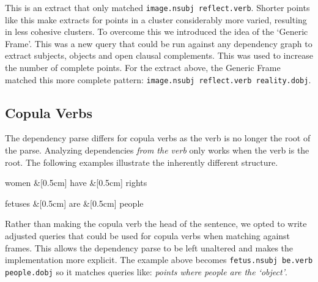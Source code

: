       This is an extract that only matched \texttt{image.nsubj reflect.verb}. Shorter points like this make extracts for points in a cluster considerably more varied, resulting in less cohesive clusters. To overcome this we introduced the idea of the `Generic Frame'. This was a new query that could be run against any dependency graph to extract subjects, objects and open clausal complements. This was used to increase the number of complete points. For the extract above, the Generic Frame matched this more complete pattern: \texttt{image.nsubj reflect.verb reality.dobj}.

    \tocless\subsection{Copula Verbs}
      The dependency parse differs for copula verbs as the verb is no longer the root of the parse. Analyzing dependencies \textit{from the verb} only works when the verb is the root. The following examples illustrate the inherently different structure.
      \begin{multicols}{2}
        \raggedcolumns
        \begin{center}
          \begin{dependency}[edge horizontal padding=0]
            \begin{deptext}
              women \&[0.5cm] have \&[0.5cm] rights \\
            \end{deptext}
          \end{dependency}
        \end{center}
        \columnbreak
        \begin{center}
          \begin{dependency}[edge horizontal padding=0]
            \begin{deptext}
              fetuses \&[0.5cm] are \&[0.5cm] people \\
            \end{deptext}
          \end{dependency}
        \end{center}
      \end{multicols}

      Rather than making the copula verb the head of the sentence, we opted to write adjusted queries that could be used for copula verbs when matching against frames. This allows the dependency parse to be left unaltered and makes the implementation more explicit. The example above becomes \texttt{fetus.nsubj be.verb people.dobj} so it matches queries like: \textit{points where people are the `object'}.

